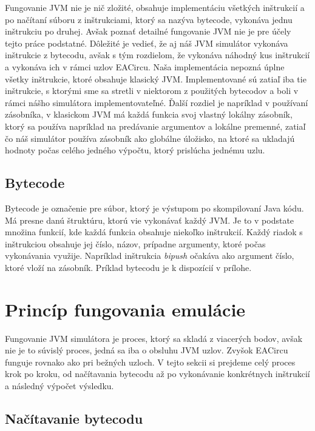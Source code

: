 Fungovanie JVM nie je nič zložité, obsahuje implementáciu všetkých inštrukcií a po načítaní súboru z inštrukciami, ktorý sa nazýva bytecode, vykonáva jednu inštrukciu po druhej. Avšak poznať detailné fungovanie JVM nie je pre účely tejto práce podstatné. Dôležité je vedieť, že aj náš JVM simulátor vykonáva inštrukcie z bytecodu, avšak s tým rozdielom, že vykonáva náhodný kus inštrukcií a vykonáva ich v rámci uzlov EACircu. Naša implementácia nepozná úplne všetky inštrukcie, ktoré obsahuje klasický JVM. Implementované sú zatiaľ iba tie inštrukcie, s ktorými sme sa stretli v niektorom z použitých bytecodov a boli v rámci nášho simulátora implementovateľné. Ďalší rozdiel je napríklad v používaní zásobníka, v klasickom JVM má každá funkcia svoj vlastný lokálny zásobník, ktorý sa používa napríklad na predávanie argumentov a lokálne premenné, zatiaľ čo náš simulátor používa zásobník ako globálne úložisko, na ktoré sa ukladajú hodnoty počas celého jedného výpočtu, ktorý prislúcha jednému uzlu.  

\subsection{Bytecode}
\label{subsec:bytecode}

Bytecode je označenie pre súbor, ktorý je výstupom po skompilovaní Java kódu. Má presne danú štruktúru, ktorú vie vykonávať každý JVM. Je to v podstate množina funkcií, kde každá funkcia obsahuje niekoľko inštrukcií. Každý riadok s inštrukciou obsahuje jej číslo, názov, prípadne argumenty, ktoré počas vykonávania využije. Napríklad inštrukcia \textit{bipush} očakáva ako argument číslo, ktoré vloží na zásobník. Príklad bytecodu je k dispozícií v prílohe.

\section{Princíp fungovania emulácie}
\label{sec:jvm-principle}

Fungovanie JVM simulátora je proces, ktorý sa skladá z viacerých bodov, avšak nie je to súvislý proces, jedná sa iba o obsluhu JVM uzlov. Zvyšok EACircu funguje rovnako ako pri bežných uzloch. V tejto sekcii si prejdeme celý proces krok po kroku, od načítavania bytecodu až po vykonávanie konkrétnych inštrukcií a následný výpočet výsledku. 

\subsection{Načítavanie bytecodu}
\label{parsing-bytecode}

